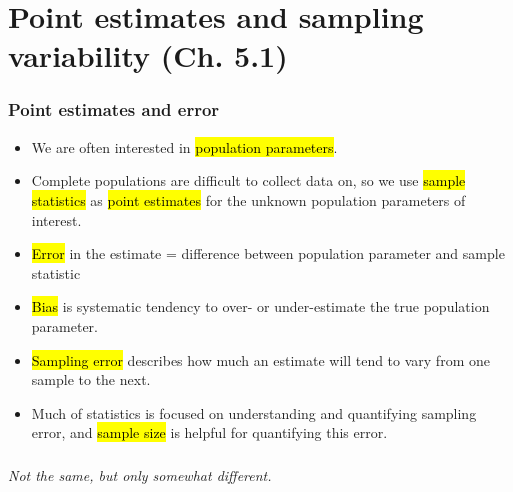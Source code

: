 \documentclass[t,compress,mathserif]{beamer}
\newcommand{\soln}[1]{\textit{#1}}
\begin{document}

\section{Point estimates and sampling variability (Ch. 5.1)}


\begin{frame}
    \frametitle{Point estimates and error}

    \begin{itemize}

        \item We are often interested in \hl{population parameters}.
        \item Complete populations are difficult to collect data on, so we use \hl{sample statistics} as \hl{point estimates} for the unknown population parameters of interest.
        \item \hl{Error} in the estimate = difference between population parameter and sample statistic
        \item \hl{Bias} is systematic tendency to over- or under-estimate the true population parameter.
        \item \hl{Sampling error} describes how much an estimate will tend to vary from one sample to the next.
        \item Much of statistics is focused on understanding and quantifying sampling error, and \hl{sample size} is helpful for quantifying this error.

    \end{itemize}

\end{frame}



\begin{frame}
    \frametitle{}
    
    
    \pause
    
    \soln{Not the same, but only somewhat different.}
    
\end{frame}

\end{document}

